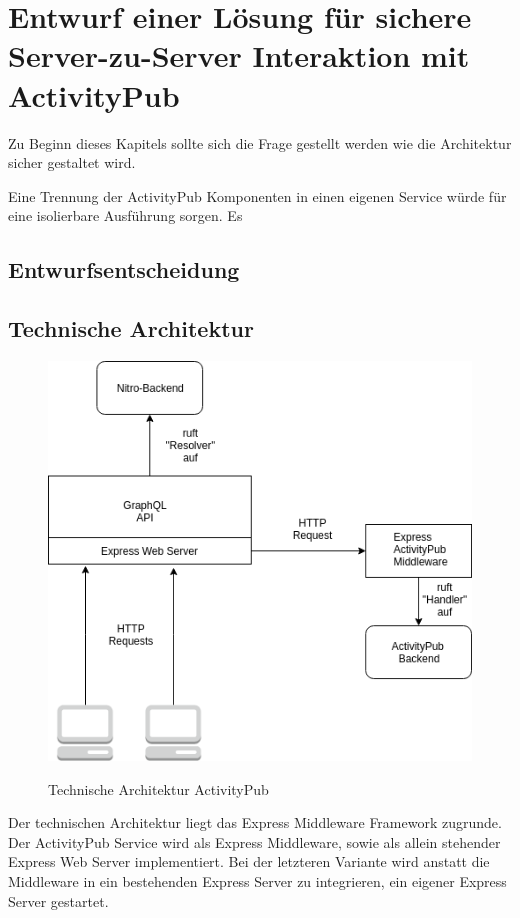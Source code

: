 
\chapter{Entwurf einer Lösung für sichere Server-zu-Server Interaktion mit ActivityPub}
Zu Beginn dieses Kapitels sollte sich die Frage gestellt werden wie die Architektur sicher gestaltet wird. 

Eine Trennung der ActivityPub Komponenten in einen eigenen Service würde für eine isolierbare Ausführung sorgen. Es
\section{Entwurfsentscheidung}
\section{Technische Architektur}
	\begin{figure}[h]
		\centering
		\includegraphics[scale=0.5]{figures/technische-architektur-activitypub.png}
		\label{technische-architektur-activitypub}
		\caption{Technische Architektur ActivityPub}
	\end{figure}
	Der technischen Architektur liegt das Express Middleware Framework zugrunde. Der ActivityPub Service wird als Express Middleware, sowie als allein stehender Express Web Server implementiert. Bei der letzteren Variante wird anstatt die Middleware in ein bestehenden Express Server zu integrieren, ein eigener Express Server gestartet.\\
	
